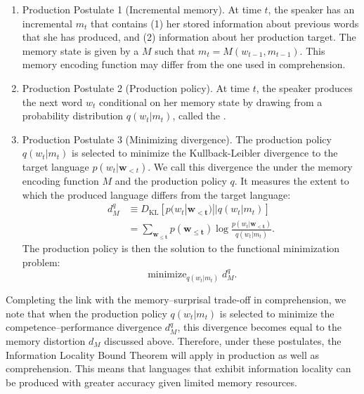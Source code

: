 \begin{enumerate}
    \item Production Postulate 1 (Incremental memory). At time $t$, the speaker has an incremental  $m_t$ that contains (1) her stored information about previous words that she has produced, and (2) information about her production target. The memory state is given by a  $M$ such that $m_t = M(w_{t-1}, m_{t-1})$. This memory encoding function may differ from the one used in comprehension.
    
    \item Production Postulate 2 (Production policy). At time $t$, the speaker produces the next word $w_t$ conditional on her memory state by drawing from a probability distribution $q(w_t | m_t)$, called the . 
    
    \item Production Postulate 3 (Minimizing divergence). The production policy $q(w_t|m_t)$ is selected to minimize the Kullback-Leibler divergence to the target language $p(w_t|\mathbf{w}_{<t})$. We call this divergence the  under the memory encoding function $M$ and the production policy $q$. It measures the extent to which the produced language differs from the target language:
    \begin{align}
    \label{eq:comp-perf-div}
    d^q_M &\equiv D_{\text{KL}} [ p(w_t|\mathbf{w_{<t}}) || q(w_t|m_t) ] \\
        &= \sum_{\mathbf{w_{\le t}}} p(\mathbf{w_{\le t}}) \log \frac{p(w_t | \mathbf{w_{<t}})}{q(w_t|m_t)}.
    \end{align}
    The production policy is then the solution to the functional minimization problem:
    \begin{equation}
        \mathop{\text{minimize }}_{q(w_t|m_t)} d^q_M.
    \end{equation}
\end{enumerate}

Completing the link with the memory--surprisal trade-off in comprehension, we note that when the production policy $q(w_t|m_t)$ is selected to minimize the competence--performance divergence $d^q_M$, this divergence becomes equal to the memory distortion $d_M$ discussed above. Therefore, under these postulates, the Information Locality Bound Theorem will apply in production as well as comprehension. This means that languages that exhibit information locality can be produced with greater accuracy given limited memory resources.

